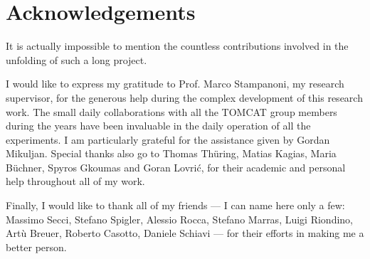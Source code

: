 
\bigskip

\begingroup
\let\clearpage\relax
\let\cleardoublepage\relax
\let\cleardoublepage\relax
\chapter*{Acknowledgements}
It is actually impossible to mention the countless contributions involved in
the unfolding of such a long project.

I would like to express my gratitude
to Prof. Marco Stampanoni, my research
supervisor, for the generous help during the complex development
of this research work. The small daily collaborations with all the TOMCAT
group members during the years have been invaluable in the daily operation
of all the experiments. I am particularly grateful for the assistance given
by Gordan Mikuljan.
Special thanks also go to Thomas Th\"uring, Matias Kagias, Maria B\"uchner,
Spyros Gkoumas and Goran Lovri\'c, for their academic and personal help
throughout all of my work.

Finally, I would like to thank all of my friends --- I can name here only a
few: Massimo Secci, Stefano Spigler, Alessio Rocca, Stefano Marras, Luigi
Riondino, Art\`u Breuer, Roberto Casotto, Daniele Schiavi --- for their
efforts in making me a better person.
\endgroup
